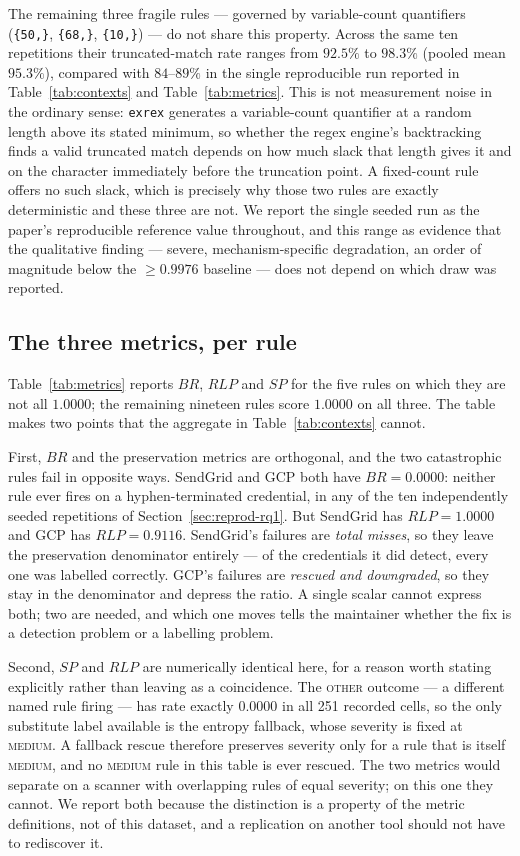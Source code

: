 \documentclass[journal]{IEEEtran}
\begin{document}
The remaining three fragile rules --- governed by variable-count quantifiers (\texttt{\{50,\}}, \texttt{\{68,\}}, \texttt{\{10,\}}) --- do not share this property. Across the same ten repetitions their truncated-match rate ranges from $92.5\%$ to $98.3\%$ (pooled mean $95.3\%$), compared with $84$--$89\%$ in the single reproducible run reported in Table~\ref{tab:contexts} and Table~\ref{tab:metrics}. This is not measurement noise in the ordinary sense: \texttt{exrex} generates a variable-count quantifier at a random length above its stated minimum, so whether the regex engine's backtracking finds a valid truncated match depends on how much slack that length gives it and on the character immediately before the truncation point. A fixed-count rule offers no such slack, which is precisely why those two rules are exactly deterministic and these three are not. We report the single seeded run as the paper's reproducible reference value throughout, and this range as evidence that the qualitative finding --- severe, mechanism-specific degradation, an order of magnitude below the $\geq 0.9976$ baseline --- does not depend on which draw was reported.

\subsection{The three metrics, per rule}

Table~\ref{tab:metrics} reports $BR$, $RLP$ and $SP$ for the five rules on which they are not all $1.0000$; the remaining nineteen rules score $1.0000$ on all three. The table makes two points that the aggregate in Table~\ref{tab:contexts} cannot.

First, $BR$ and the preservation metrics are orthogonal, and the two catastrophic rules fail in opposite ways. SendGrid and GCP both have $BR = 0.0000$: neither rule ever fires on a hyphen-terminated credential, in any of the ten independently seeded repetitions of Section~\ref{sec:reprod-rq1}. But SendGrid has $RLP = 1.0000$ and GCP has $RLP = 0.9116$. SendGrid's failures are \emph{total misses}, so they leave the preservation denominator entirely --- of the credentials it did detect, every one was labelled correctly. GCP's failures are \emph{rescued and downgraded}, so they stay in the denominator and depress the ratio. A single scalar cannot express both; two are needed, and which one moves tells the maintainer whether the fix is a detection problem or a labelling problem.

Second, $SP$ and $RLP$ are numerically identical here, for a reason worth stating explicitly rather than leaving as a coincidence. The \textsc{other} outcome --- a different named rule firing --- has rate exactly $0.0000$ in all 251 recorded cells, so the only substitute label available is the entropy fallback, whose severity is fixed at \textsc{medium}. A fallback rescue therefore preserves severity only for a rule that is itself \textsc{medium}, and no \textsc{medium} rule in this table is ever rescued. The two metrics would separate on a scanner with overlapping rules of equal severity; on this one they cannot. We report both because the distinction is a property of the metric definitions, not of this dataset, and a replication on another tool should not have to rediscover it.
\end{document}
